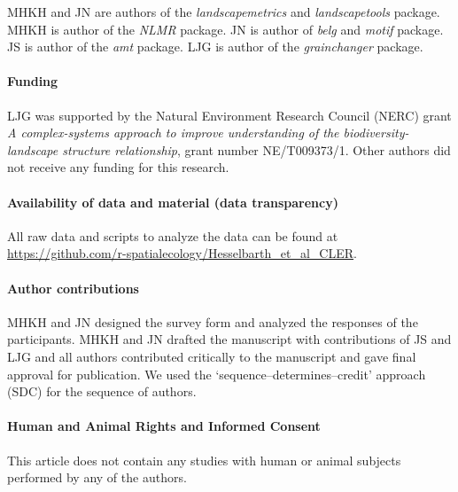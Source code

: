 \documentclass[smallextended]{svjour3}       %
\begin{document}
MHKH and JN are authors of the \textit{landscapemetrics} and \textit{landscapetools} package.
MHKH is author of the \textit{NLMR} package.
JN is author of \textit{belg} and \textit{motif} package. JS is author of the \textit{amt} package. LJG is author of the \textit{grainchanger} package.

\hypertarget{funding}{%
\paragraph{Funding}\label{funding}}

LJG was supported by the Natural Environment Research Council (NERC) grant \textit{A complex-systems approach to improve understanding of the biodiversity-landscape structure relationship}, grant number NE/T009373/1.
Other authors did not receive any funding for this research.

\hypertarget{availability-of-data-and-material-data-transparency}{%
\paragraph{Availability of data and material (data transparency)}\label{availability-of-data-and-material-data-transparency}}

All raw data and scripts to analyze the data can be found at \url{https://github.com/r-spatialecology/Hesselbarth_et_al_CLER}.

\hypertarget{author-contributions}{%
\paragraph{Author contributions}\label{author-contributions}}

MHKH and JN designed the survey form and analyzed the responses of the participants.
MHKH and JN drafted the manuscript with contributions of JS and LJG and all authors contributed critically to the manuscript and gave final approval for publication.
We used the `sequence--determines--credit' approach (SDC) for the sequence of authors.

\hypertarget{human-and-animal-rights-and-informed-consent}{%
\paragraph{Human and Animal Rights and Informed Consent}\label{human-and-animal-rights-and-informed-consent}}

This article does not contain any studies with human or animal subjects performed by any of the authors.
\end{document}
